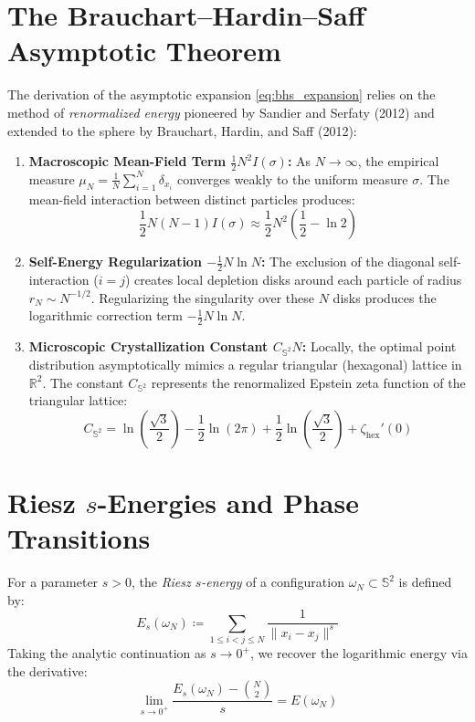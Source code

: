 \documentclass[11pt,a4paper]{article}
\theoremstyle{definition}
\begin{document}
\section{The Brauchart--Hardin--Saff Asymptotic Theorem}

The derivation of the asymptotic expansion \eqref{eq:bhs_expansion} relies on the method of \emph{renormalized energy} pioneered by Sandier and Serfaty (2012) and extended to the sphere by Brauchart, Hardin, and Saff (2012):

\begin{enumerate}
    \item \textbf{Macroscopic Mean-Field Term $\frac{1}{2} N^2 I(\sigma)$:} As $N \to \infty$, the empirical measure $\mu_N = \frac{1}{N} \sum_{i=1}^N \delta_{x_i}$ converges weakly to the uniform measure $\sigma$. The mean-field interaction between distinct particles produces:
    \[ \frac{1}{2} N(N - 1) I(\sigma) \approx \frac{1}{2} N^2 \left( \frac{1}{2} - \ln 2 \right) \]
    
    \item \textbf{Self-Energy Regularization $-\frac{1}{2} N \ln N$:} The exclusion of the diagonal self-interaction ($i = j$) creates local depletion disks around each particle of radius $r_N \sim N^{-1/2}$. Regularizing the singularity over these $N$ disks produces the logarithmic correction term $-\frac{1}{2} N \ln N$.
    
    \item \textbf{Microscopic Crystallization Constant $C_{\mathbb{S}^2} N$:} Locally, the optimal point distribution asymptotically mimics a regular triangular (hexagonal) lattice in $\mathbb{R}^2$. The constant $C_{\mathbb{S}^2}$ represents the renormalized Epstein zeta function of the triangular lattice:
    \begin{equation}\label{eq:epstein_zeta}
    C_{\mathbb{S}^2} = \ln \left( \frac{\sqrt{3}}{2} \right) - \frac{1}{2} \ln(2\pi) + \frac{1}{2} \ln\left( \frac{\sqrt{3}}{2} \right) + \zeta_{\text{hex}}'(0)
    \end{equation}
\end{enumerate}

\section{Riesz $s$-Energies and Phase Transitions}

For a parameter $s > 0$, the \emph{Riesz $s$-energy} of a configuration $\omega_N \subset \mathbb{S}^2$ is defined by:
\begin{equation}\label{eq:riesz_energy}
E_s(\omega_N) \coloneqq \sum_{1 \le i < j \le N} \frac{1}{\|x_i - x_j\|^s}
\end{equation}
Taking the analytic continuation as $s \to 0^+$, we recover the logarithmic energy via the derivative:
\begin{equation}\label{eq:riesz_log_limit}
\lim_{s \to 0^+} \frac{E_s(\omega_N) - \binom{N}{2}}{s} = E(\omega_N)
\end{equation}
\end{document}
